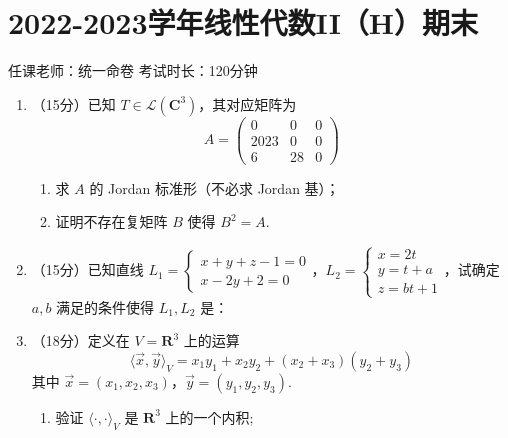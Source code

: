 \section{2022-2023学年线性代数II（H）期末}

\begin{center}
    任课老师：统一命卷\hspace{4em} 考试时长：120分钟
\end{center}

\begin{enumerate}
    \item （15分）已知 $ T \in \mathcal{L}(\mathbf{C}^3) $，其对应矩阵为
    \[ A = \begin{pmatrix} 0 & 0 & 0 \\ 2023 & 0 & 0 \\ 6 & 28 & 0 \end{pmatrix} \]
       \begin{enumerate}
        \item 求 $A$ 的 Jordan 标准形（不必求 Jordan 基）；

        \item 证明不存在复矩阵 $B$ 使得 $B^2 = A$.
    \end{enumerate}
    \item （15分）已知直线 $ L_1 = \begin{cases} x + y + z - 1 = 0 \\ x - 2y + 2 = 0 \end{cases} $，$ L_2 = \begin{cases} x = 2t \\ y = t + a \\ z = bt + 1 \end{cases} $，试确定 $ a, b $ 满足的条件使得 $ L_1, L_2 $ 是：


    \item （18分）定义在 $ V = \mathbf{R}^3 $ 上的运算
       \[ \langle \vec{x}, \vec{y} \rangle_V = x_1 y_1 + x_2 y_2 + (x_2 + x_3)(y_2 + y_3) \]
    其中 $ \vec{x} = (x_1, x_2, x_3) $，$ \vec{y} = (y_1, y_2, y_3) $.
    \begin{enumerate}
        \item 验证 $ \langle \cdot, \cdot \rangle_V $ 是 $ \mathbf{R}^3 $ 上的一个内积;


\end{enumerate}
\end{enumerate}

